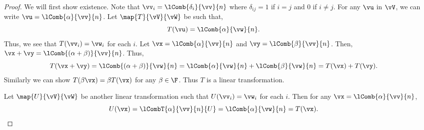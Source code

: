 \begin{proof}
    We will first show existence. 
    Note that $\vv_i = \lComb{\delta_{i}}{\vv}{n}$ where $\delta_{ij} = 1$ if $i = j$ and $0$ if $i\neq j$.
    For any $\vu$ in $\vV$, we can write $\vu = \lComb{\alpha}{\vv}{n}$.
    Let $\map{T}{\vV}{\vW}$ be such that,
    \[T(\vu) = \lComb{\alpha}{\vw}{n}.\]
    Thus, we see that $T(\vv_i) = \vw_{i}$ for each $i$. 
    Let $\vx = \lComb{\alpha}{\vv}{n}$ and $\vy = \lComb{\beta}{\vv}{n}$. Then,
    $\vx + \vy = \lComb{(\alpha + \beta)}{\vv}{n}$.
    Thus,
    \[T(\vx + \vy) = \lComb{(\alpha + \beta)}{\vw}{n} = \lComb{\alpha}{\vw}{n} + \lComb{\beta}{\vw}{n} =
	T(\vx) + T(\vy).\]
    Similarly we can show $T(\beta\vx) = \beta T(\vx)$ for any $\beta \in \F$. Thus $T$ is a linear
    transformation.

    Let $\map{U}{\vV}{\vW}$ be another linear transformation such that $U(\vv_{i}) = \vw_{i}$ for each $i$.
    Then for any $\vx = \lComb{\alpha}{\vv}{n}$,
    \[U(\vx) = \lCombT{\alpha}{\vv}{n}{U} = \lComb{\alpha}{\vw}{n} = T(\vx).\]
\end{proof}
